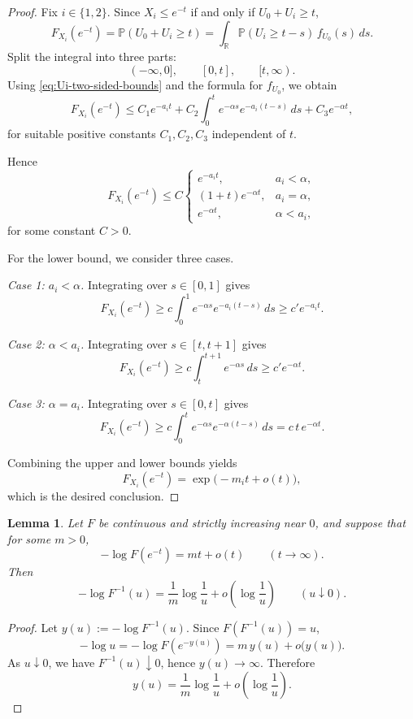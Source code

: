 \documentclass[11pt]{article}
\newtheorem{lemma}[theorem]{Lemma}
\begin{document}
\begin{proof}
Fix $i\in\{1,2\}$. Since $X_i\le e^{-t}$ if and only if $U_0+U_i\ge t$,
\[
F_{X_i}(e^{-t})
=
\mathbb P(U_0+U_i\ge t)
=
\int_{\mathbb R}\mathbb P(U_i\ge t-s)\,f_{U_0}(s)\,ds.
\]
Split the integral into three parts:
\[
(-\infty,0],\qquad [0,t],\qquad [t,\infty).
\]
Using \eqref{eq:Ui-two-sided-bounds} and the formula for $f_{U_0}$, we obtain
\[
F_{X_i}(e^{-t})
\le
C_1 e^{-a_i t}
+
C_2 \int_0^t e^{-\alpha s}e^{-a_i(t-s)}\,ds
+
C_3 e^{-\alpha t},
\]
for suitable positive constants $C_1,C_2,C_3$ independent of $t$.

Hence
\[
F_{X_i}(e^{-t})
\le
C
\begin{cases}
e^{-a_i t}, & a_i<\alpha,\\[1mm]
(1+t)e^{-\alpha t}, & a_i=\alpha,\\[1mm]
e^{-\alpha t}, & \alpha<a_i,
\end{cases}
\]
for some constant $C>0$.

For the lower bound, we consider three cases.

\smallskip

\noindent
\emph{Case 1: $a_i<\alpha$.}
Integrating over $s\in[0,1]$ gives
\[
F_{X_i}(e^{-t})
\ge
c \int_0^1 e^{-\alpha s} e^{-a_i(t-s)}\,ds
\ge
c' e^{-a_i t}.
\]

\noindent
\emph{Case 2: $\alpha<a_i$.}
Integrating over $s\in[t,t+1]$ gives
\[
F_{X_i}(e^{-t})
\ge
c \int_t^{t+1} e^{-\alpha s}\,ds
\ge
c' e^{-\alpha t}.
\]

\noindent
\emph{Case 3: $\alpha=a_i$.}
Integrating over $s\in[0,t]$ gives
\[
F_{X_i}(e^{-t})
\ge
c \int_0^t e^{-\alpha s}e^{-\alpha(t-s)}\,ds
=
c\, t\, e^{-\alpha t}.
\]

Combining the upper and lower bounds yields
\[
F_{X_i}(e^{-t})
=
\exp\!\bigl(-m_i t + o(t)\bigr),
\]
which is the desired conclusion.
\end{proof}

\begin{lemma}\label{lem:quantile-log}
Let $F$ be continuous and strictly increasing near $0$, and suppose that for some $m>0$,
\[
-\log F(e^{-t}) = m t + o(t)
\qquad (t\to\infty).
\]
Then
\[
-\log F^{-1}(u)
=
\frac{1}{m}\log\!\frac{1}{u}
+
o\!\left(\log\!\frac{1}{u}\right)
\qquad (u\downarrow 0).
\]
\end{lemma}

\begin{proof}
Let $y(u):=-\log F^{-1}(u)$. Since $F(F^{-1}(u))=u$,
\[
-\log u
=
-\log F(e^{-y(u)})
=
m\,y(u)+o\!\bigl(y(u)\bigr).
\]
As $u\downarrow 0$, we have $F^{-1}(u)\downarrow 0$, hence $y(u)\to\infty$. Therefore
\[
y(u)
=
\frac{1}{m}\log\!\frac{1}{u}
+
o\!\left(\log\!\frac{1}{u}\right).
\]
\end{proof}
\end{document}
